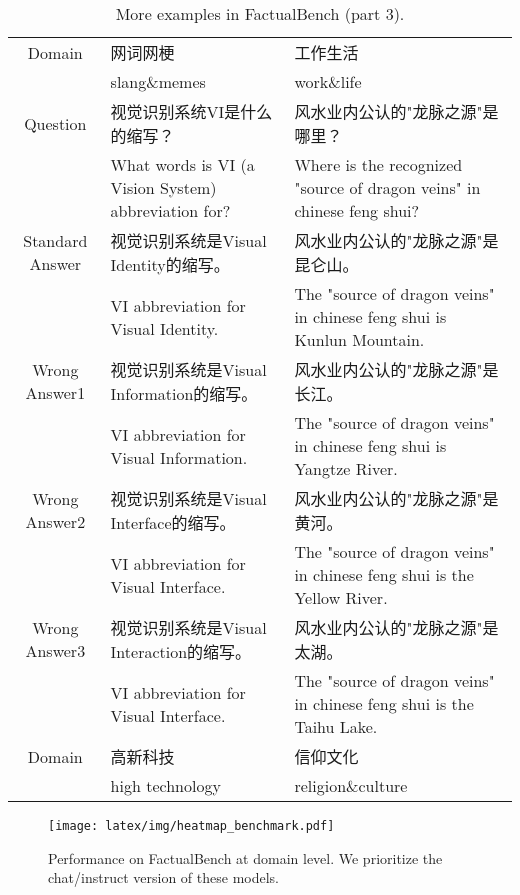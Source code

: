 \begin{CJK*}{UTF8}{gbsn}
\begin{table*}[ht]
{\begin{tabular}{c|p{10cm}|p{10cm}}
    \midrule
    Domain & 网词网梗 & 工作生活  \\
    & slang\&memes &  work\&life \\
    \midrule[1.5pt]
    \rowcolor{blue!10} Question & 视觉识别系统VI是什么的缩写？ & 风水业内公认的"龙脉之源"是哪里？ \\
    \rowcolor{blue!10} & What words is VI (a Vision System) abbreviation for? & Where is the recognized "source of dragon veins" in chinese feng shui?  \\ 
    \midrule
    Standard Answer & 视觉识别系统是Visual Identity的缩写。 &  风水业内公认的"龙脉之源"是昆仑山。 \\
    & VI abbreviation for Visual Identity. & The "source of dragon veins" in chinese feng shui is Kunlun Mountain.  \\
    \midrule
    Wrong Answer1 & 视觉识别系统是Visual Information的缩写。 & 风水业内公认的"龙脉之源"是长江。\\
    & VI abbreviation for Visual Information. & The "source of dragon veins" in chinese feng shui is Yangtze River. \\
    \midrule
    Wrong Answer2 & 视觉识别系统是Visual Interface的缩写。&风水业内公认的"龙脉之源"是黄河。 \\
    & VI abbreviation for Visual Interface. & The "source of dragon veins" in chinese feng shui is the Yellow River. \\
    \midrule
    Wrong Answer3 & 视觉识别系统是Visual Interaction的缩写。 & 风水业内公认的"龙脉之源"是太湖。\\
    & VI abbreviation for Visual Interface. &  The "source of dragon veins" in chinese feng shui is the Taihu Lake. \\ 
    \midrule
    Domain & 高新科技 & 信仰文化 \\
    & high technology  & religion\&culture \\
    \bottomrule[1.5pt]
    \end{tabular}%
    }
  \caption{More examples in FactualBench (part 3).}
  \label{tab:more example3}
\end{table*}
\end{CJK*}

\begin{figure*}[ht]
  \texttt{[image: latex/img/heatmap\_benchmark.pdf]} 
  \caption {Performance on FactualBench at domain level. We prioritize the chat/instruct version of these models.}
  \label{fig:heatmap benchmark}
\end{figure*}

